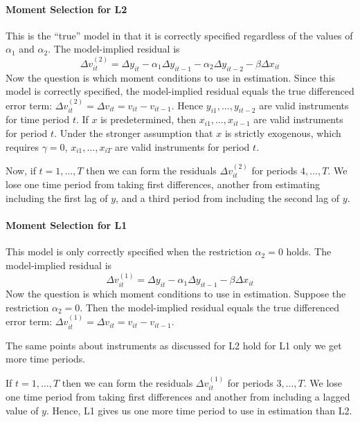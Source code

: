 \documentclass[12pt]{article}
\begin{document}
\paragraph{Moment Selection for L2} This is the ``true'' model in that it is correctly specified regardless of the values of $\alpha_1$ and $\alpha_2$. The model-implied residual is
$$\Delta v_{it}^{(2)}=  \Delta y_{it} -  \alpha_1 \Delta y_{it-1} - \alpha_2 \Delta y_{it-2} - \beta \Delta x_{it}$$
Now the question is which moment conditions to use in estimation. Since this model is correctly specified, the model-implied residual equals the true differenced error term: $\Delta v_{it}^{(2)} = \Delta v_{it} = v_{it} - v_{it-1}$. Hence $y_{i1}, \hdots, y_{it-2}$ are valid instruments for time period $t$. If $x$ is predetermined, then $x_{i1}, \hdots, x_{it-1}$ are valid instruments for period $t$. Under the stronger assumption that $x$ is strictly exogenous, which requires $\gamma=0$, $x_{i1}, \hdots, x_{iT}$ are valid instruments for period $t$.




Now, if $t = 1, \hdots, T$ then we can form the residuals $\Delta v_{it}^{(2)}$ for periods $4, \hdots, T$. We lose one time period from taking first differences, another from estimating including the first lag of $y$, and a third period from including the second lag of $y$.



\paragraph{Moment Selection for L1} This model is only correctly specified when the restriction $\alpha_2 = 0$ holds. The model-implied residual is
$$\Delta v_{it}^{(1)}= \Delta y_{it} -  \alpha_1 \Delta y_{it-1} -\beta \Delta x_{it}$$
Now the question is which moment conditions to use in estimation. Suppose the restriction $\alpha_2 = 0$. Then the model-implied residual equals the true differenced error term: $\Delta v_{it}^{(1)} = \Delta v_{it}= v_{it} - v_{it-1}$. 

The same points about instruments as discussed for L2 hold for L1 only we get more time periods.

If $t = 1, \hdots, T$ then we can form the residuals $\Delta v_{it}^{(1)}$ for periods $3, \hdots, T$. We lose one time period from taking first differences and another from including a lagged value of $y$. Hence, L1 gives us one more time period to use in estimation than L2.
\end{document}
